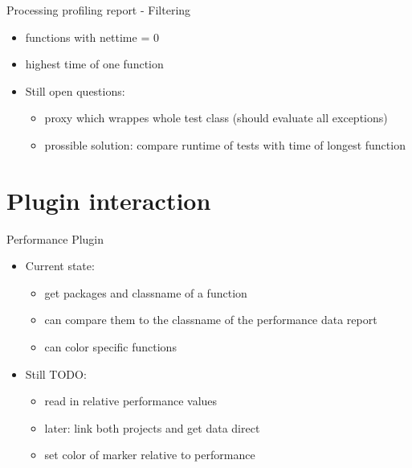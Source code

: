 \documentclass[11pt,aspectratio=169]{beamer}
\begin{document}
\begin{frame}{Processing profiling report - Filtering}
  \begin{itemize}
    \item functions with nettime = 0
    \item highest time of one function
    \item Still open questions:
    \begin{itemize}
      \item proxy which wrappes whole test class (should evaluate all exceptions)
      \item prossible solution: compare runtime of tests with time of longest function
    \end{itemize}
  \end{itemize}
\end{frame}

\section{Plugin interaction}

\begin{frame}{Performance Plugin}
  \begin{itemize}
    \item Current state:
      \begin{itemize}
        \item get packages and classname of a function
        \item can compare them to the classname of the performance data report
        \item can color specific functions
      \end{itemize}  
    \item Still TODO:
      \begin{itemize}
        \item read in relative performance values
        \item later: link both projects and get data direct
        \item set color of marker relative to performance
      \end{itemize}  
  \end{itemize}
\end{frame}


%   
\end{document}
